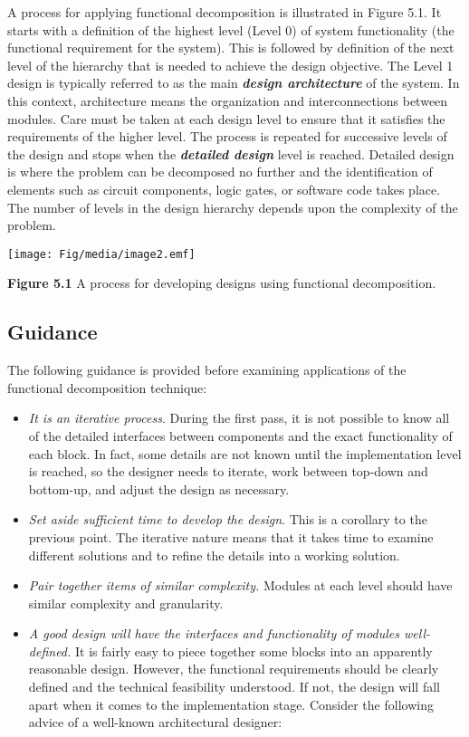 A process for applying functional decomposition is illustrated in Figure
5.1. It starts with a definition of the highest level (Level 0) of
system functionality (the functional requirement for the system). This
is followed by definition of the next level of the hierarchy that is
needed to achieve the design objective. The Level 1 design is typically
referred to as the main \emph{\textbf{design architecture}} of the
system. In this context, architecture means the organization and
interconnections between modules. Care must be taken at each design
level to ensure that it satisfies the requirements of the higher level.
The process is repeated for successive levels of the design and stops
when the \emph{\textbf{detailed design}} level is reached. Detailed
design is where the problem can be decomposed no further and the
identification of elements such as circuit components, logic gates, or
software code takes place. The number of levels in the design hierarchy
depends upon the complexity of the problem.

\texttt{[image: Fig/media/image2.emf]}

\textbf{Figure 5.1} A process for developing designs using functional
decomposition.

\subsection{Guidance}\label{guidance}

The following guidance is provided before examining applications of the
functional decomposition technique:

\begin{itemize}
\item
  \emph{It is an iterative process}. During the first pass, it is not
  possible to know all of the detailed interfaces between components and
  the exact functionality of each block. In fact, some details are not
  known until the implementation level is reached, so the designer needs
  to iterate, work between top-down and bottom-up, and adjust the design
  as necessary.
\item
  \emph{Set aside sufficient time to develop the design}. This is a
  corollary to the previous point. The iterative nature means that it
  takes time to examine different solutions and to refine the details
  into a working solution.
\item
  \emph{Pair together items of similar complexity.} Modules at each
  level should have similar complexity and granularity.
\item
  \emph{A good design will have the interfaces and functionality of
  modules well-defined.} It is fairly easy to piece together some blocks
  into an apparently reasonable design. However, the functional
  requirements should be clearly defined and the technical feasibility
  understood. If not, the design will fall apart when it comes to the
  implementation stage. Consider the following advice of a well-known
  architectural designer:
\end{itemize}

